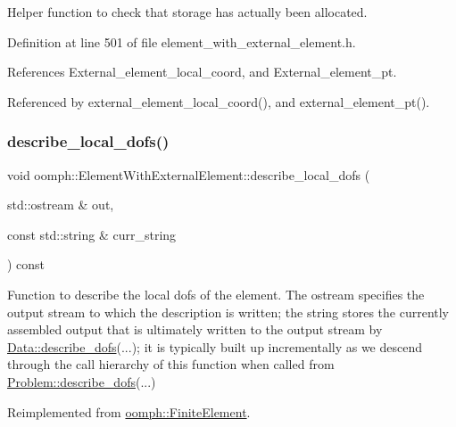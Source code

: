 Helper function to check that storage has actually been allocated. 



Definition at line 501 of file element\+\_\+with\+\_\+external\+\_\+element.\+h.



References External\+\_\+element\+\_\+local\+\_\+coord, and External\+\_\+element\+\_\+pt.



Referenced by external\+\_\+element\+\_\+local\+\_\+coord(), and external\+\_\+element\+\_\+pt().

\mbox{\label{classoomph_1_1ElementWithExternalElement_a2a1753bed2e822d399aa3525f1bdac4b}} 
\subsubsection{\texorpdfstring{describe\+\_\+local\+\_\+dofs()}{describe\_local\_dofs()}}
{\footnotesize\ttfamily void oomph\+::\+Element\+With\+External\+Element\+::describe\+\_\+local\+\_\+dofs (\begin{DoxyParamCaption}\item[{std\+::ostream \&}]{out,  }\item[{const std\+::string \&}]{curr\+\_\+string }\end{DoxyParamCaption}) const\hspace{0.3cm}{\ttfamily [virtual]}}



Function to describe the local dofs of the element. The ostream specifies the output stream to which the description is written; the string stores the currently assembled output that is ultimately written to the output stream by \hyperlink{classoomph_1_1Data_a2dae16e2dcff9a40029f834c83364df5}{Data\+::describe\+\_\+dofs}(...); it is typically built up incrementally as we descend through the call hierarchy of this function when called from \hyperlink{classoomph_1_1Problem_abc103804eb319ae0b3d43870cc3e1eaf}{Problem\+::describe\+\_\+dofs}(...) 



Reimplemented from \hyperlink{classoomph_1_1FiniteElement_aad9f9ebb2996fd9c44caf34da8bc7941}{oomph\+::\+Finite\+Element}.



